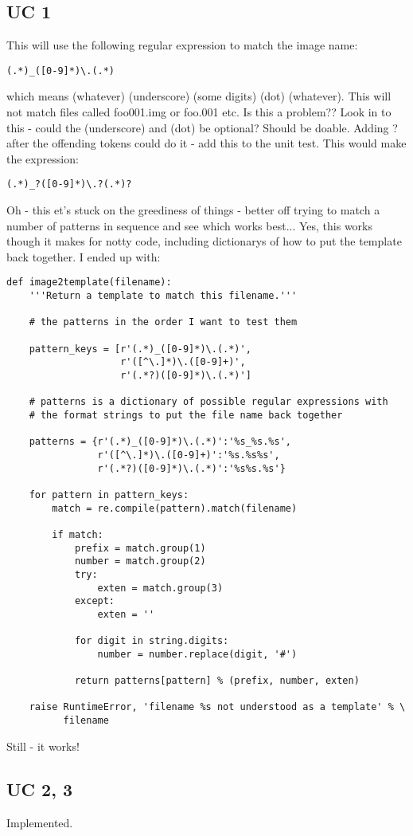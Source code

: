 \documentclass[a4paper, 11pt]{article}
\begin{document}
\subsection{UC 1}

This will use the following regular expression to match the image name:

{
\tiny
\begin{verbatim}
(.*)_([0-9]*)\.(.*)
\end{verbatim}
}

which means (whatever) (underscore) (some digits) (dot) (whatever). This will
not match files called foo001.img or foo.001 etc. Is this a problem?? Look 
in to this - could the (underscore) and (dot) be optional? Should be doable.
Adding ? after the offending tokens could do it - add this to the unit test.
This would make the expression:

{
\tiny
\begin{verbatim}
(.*)_?([0-9]*)\.?(.*)?
\end{verbatim}
}

Oh - this et's stuck on the greediness of things - better off trying to 
match a number of patterns in sequence and see which works best... Yes, this
works though it makes for notty code, including dictionarys of how to put
the template back together. I ended up with:

{
\tiny
\begin{verbatim}
def image2template(filename):
    '''Return a template to match this filename.'''

    # the patterns in the order I want to test them

    pattern_keys = [r'(.*)_([0-9]*)\.(.*)',
                    r'([^\.]*)\.([0-9]+)',
                    r'(.*?)([0-9]*)\.(.*)']

    # patterns is a dictionary of possible regular expressions with
    # the format strings to put the file name back together

    patterns = {r'(.*)_([0-9]*)\.(.*)':'%s_%s.%s',
                r'([^\.]*)\.([0-9]+)':'%s.%s%s',
                r'(.*?)([0-9]*)\.(.*)':'%s%s.%s'}

    for pattern in pattern_keys:
        match = re.compile(pattern).match(filename)

        if match:
            prefix = match.group(1)
            number = match.group(2)
            try:
                exten = match.group(3)
            except:
                exten = ''

            for digit in string.digits:
                number = number.replace(digit, '#')
                
            return patterns[pattern] % (prefix, number, exten)

    raise RuntimeError, 'filename %s not understood as a template' % \
          filename
\end{verbatim}
}

Still - it works!

\subsection{UC 2, 3}

Implemented.
\end{document}

